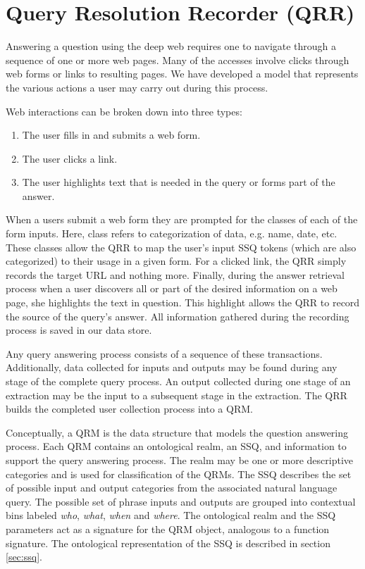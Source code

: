 \section{Query Resolution Recorder (QRR)}
\label{sec:qrr}
Answering a question using the deep web requires one to navigate
through a sequence of one or more web pages. Many of the accesses
involve clicks through web forms or links to resulting pages.  We have
developed a model that represents the various actions a user may carry
out during this process.

Web interactions can be broken down into three types:
\begin{enumerate}
\item The user fills in and submits a web form.
\item The user clicks a link.
\item The user highlights text that is needed in the query or forms
  part of the answer.
\end{enumerate}

When a users submit a web form they are prompted for the classes of
each of the form inputs. Here, class refers to categorization of data,
e.g. name, date, etc. These classes allow the QRR to map the user's
input SSQ tokens (which are also categorized) to their usage in a
given form. For a clicked link, the QRR simply records the target URL
and nothing more. Finally, during the answer retrieval process when a
user discovers all or part of the desired information on a web page,
she highlights the text in question. This highlight allows the QRR to
record the source of the query's answer. All information gathered
during the recording process is saved in our data store.

Any query answering process consists of a sequence of these transactions.
Additionally, data collected for inputs and outputs may be found
during any stage of the complete query process.  An output
collected during one stage of an extraction may be the input to a
subsequent stage in the extraction.  The QRR builds the completed user
collection process into a QRM.  

Conceptually, a QRM is the data structure that models the question
answering process.  Each QRM contains an ontological realm, an SSQ,
and information to support the query answering process.  The realm may
be one or more descriptive categories and is used for classification
of the QRMs.  The SSQ describes the set of possible input and output
categories from the associated natural language query.  The possible
set of phrase inputs and outputs are grouped into contextual bins
labeled \emph{who}, \emph{what}, \emph{when} and \emph{where}.  The
ontological realm and the SSQ parameters act as a signature for the
QRM object, analogous to a function signature.  The ontological
representation of the SSQ is described in section \ref{sec:ssq}.

